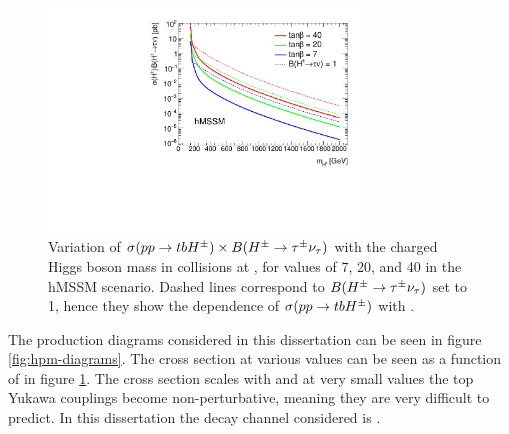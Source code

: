 	\begin{figure}[!ht]
		\centering
		\includegraphics[width=0.75\textwidth]{chapters/chapter2_theory/images/XSBR_hmssm.pdf}
		\caption{\label{fig:hpm-xsec} Variation of $\sigma(pp \to tbH^{\pm}) \times B(H^{\pm} \to \tau^{\pm} \nu_{\tau})$ with the charged Higgs boson mass in \pp collisions at \sqs, for \tanb values of 7, 20, and 40 in the hMSSM scenario. Dashed lines correspond to $B(H^{\pm} \to \tau^{\pm} \nu_{\tau})$ set to 1, hence they show the dependence of $\sigma(pp \to tbH^{\pm})$ with \mHpm. \cite{hpm-previous} }
	\end{figure}
	The production diagrams considered in this dissertation can be seen in figure \ref{fig:hpm-diagrams}. The cross section at various \tanb values can be seen as a function of \mHpm in figure \ref{fig:hpm-xsec}. The cross section scales with \tanb and at very small values the top Yukawa couplings become non-perturbative, meaning they are very difficult to predict. In this dissertation the decay channel considered is \HpmLong. 
